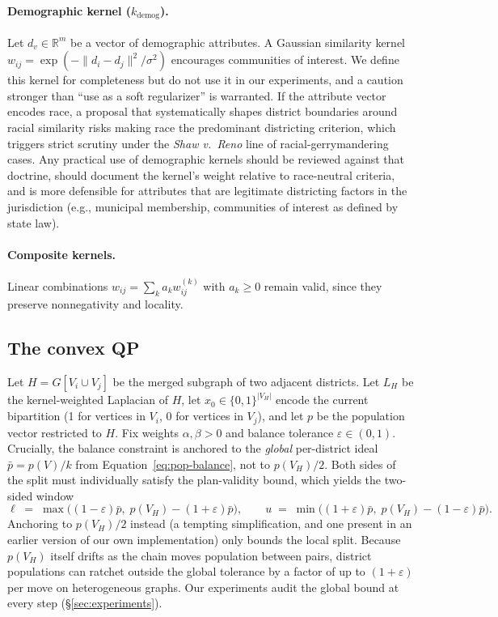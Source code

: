 \documentclass[11pt]{article}
\newcommand{\R}{\mathbb{R}}
\begin{document}
\paragraph{Demographic kernel ($k_{\mathrm{demog}}$).} Let
$d_v \in \R^m$ be a vector of demographic attributes. A Gaussian
similarity kernel $w_{ij} = \exp(-\|d_i - d_j\|^2 / \sigma^2)$
encourages communities of interest. We define this kernel for
completeness but do not use it in our experiments, and a caution
stronger than ``use as a soft regularizer'' is warranted. If the
attribute vector encodes race, a proposal that systematically shapes
district boundaries around racial similarity risks making race the
predominant districting criterion, which triggers strict scrutiny
under the \emph{Shaw v.\ Reno} line of racial-gerrymandering cases.
Any practical use of demographic kernels should be reviewed against
that doctrine, should document the kernel's weight relative to
race-neutral criteria, and is more defensible for attributes that are
legitimate districting factors in the jurisdiction (e.g., municipal
membership, communities of interest as defined by state law).

\paragraph{Composite kernels.} Linear combinations $w_{ij} = \sum_k a_k w_{ij}^{(k)}$
with $a_k \ge 0$ remain valid, since they preserve nonnegativity and locality.

\subsection{The convex QP}\label{sec:qp-model}

Let $H = G[V_i \cup V_j]$ be the merged subgraph of two adjacent
districts. Let $L_H$ be the kernel-weighted Laplacian of $H$, let
$x_0 \in \{0,1\}^{|V_H|}$ encode the current bipartition (1 for
vertices in $V_i$, 0 for vertices in $V_j$), and let $p$ be the
population vector restricted to $H$. Fix weights $\alpha, \beta > 0$
and balance tolerance $\varepsilon \in (0, 1)$. Crucially, the balance
constraint is anchored to the \emph{global} per-district ideal
$\bar p = p(V)/k$ from Equation~\eqref{eq:pop-balance}, not to
$p(V_H)/2$. Both sides of the split must individually satisfy the
plan-validity bound, which yields the two-sided window
\begin{equation}\label{eq:balance-window}
  \ell \;=\; \max\bigl((1-\varepsilon)\bar p,\; p(V_H) - (1+\varepsilon)\bar p\bigr),
  \qquad
  u \;=\; \min\bigl((1+\varepsilon)\bar p,\; p(V_H) - (1-\varepsilon)\bar p\bigr).
\end{equation}
Anchoring to $p(V_H)/2$ instead (a tempting simplification, and one
present in an earlier version of our own implementation) only bounds
the local split. Because $p(V_H)$ itself drifts as the chain moves
population between pairs, district populations can ratchet outside the
global tolerance by a factor of up to $(1+\varepsilon)$ per move on
heterogeneous graphs. Our experiments audit the global bound at every
step (\S\ref{sec:experiments}).
\end{document}

